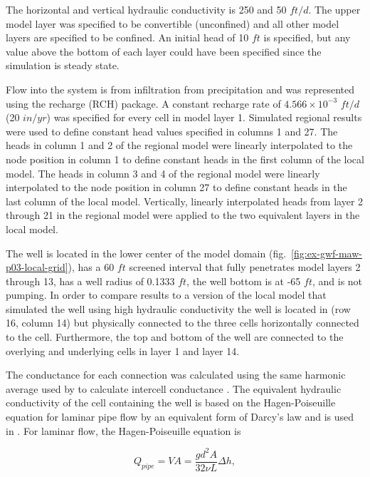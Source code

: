 The horizontal and vertical hydraulic conductivity is 250 and 50 $ft/d$. The upper model layer was specified to be convertible (unconfined) and all other model layers are specified to be confined. An initial head of 10 $ft$ is specified, but any value above the bottom of each layer could have been specified since the simulation is steady state. 

Flow into the system is from infiltration from precipitation and was represented using the recharge (RCH) package. A constant recharge rate of $4.566 \times 10^{-3}$ $ft/d$ (20 $in/yr$) was specified for every cell in model layer 1. Simulated regional results were used to define constant head values specified in columns 1 and 27. The heads in column 1 and 2 of the regional model were linearly interpolated to the node position in column 1 to define constant heads in the first column of the local model. The heads in column 3 and 4 of the regional model were linearly interpolated to the node position in column 27 to define constant heads in the last column of the local model. Vertically, linearly interpolated heads from layer 2 through 21 in the regional model were applied to the two equivalent layers in the local model.

The well is located in the lower center of the model domain (fig.~\ref{fig:ex-gwf-maw-p03-local-grid}), has a 60 $ft$ screened interval that fully penetrates model layers 2 through 13, has a well radius of 0.1333 $ft$, the well bottom is at -65 $ft$, and is not pumping. In order to compare results to a version of the local model that simulated the well using high hydraulic conductivity the well is located in (row 16, column 14) but physically connected to the three cells horizontally connected to the cell. Furthermore, the top and bottom of the well are connected to the overlying and underlying cells in layer 1 and layer 14.

The conductance for each connection was calculated using the same harmonic average used by \mf to calculate intercell conductance \cite[see][eq.4-24]{modflow6gwf}. The equivalent hydraulic conductivity of the cell containing the well is based on the Hagen-Poiseuille equation for laminar pipe flow by an equivalent form of Darcy's law and is used in \mf. For laminar flow, the Hagen-Poiseuille equation is

\begin{equation}
	\label{eq:hagenpoiseuille}
	Q_{pipe} = VA = \frac{g d^{2} A}{32 \nu L} \Delta h,
\end{equation}

